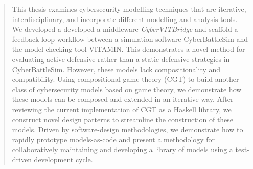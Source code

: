 \begin{abstract}

This thesis examines cybersecurity modelling techniques that are iterative, interdisciplinary, and incorporate different modelling and analysis tools. We developed a developed a middleware \textit{CyberVITBridge} and scaffold a feedback-loop workflow between a simulation software CyberBattleSim and the model-checking tool VITAMIN. This demonstrates a novel method for evaluating active defensive rather than a static defensive strategies in CyberBattleSim. However, these models lack compositionality and compatibility. Using compositional game theory (CGT) to build another class of cybersecurity models based on game theory, we demonstrate how these models can be composed and extended in an iterative way. After reviewing the current implementation of CGT as a Haskell library, we construct novel design patterns to streamline the construction of these models. Driven by software-design methodologies, we demonstrate how to rapidly prototype models-as-code and present a methodology for collaboratively maintaining and developing a library of models using a test-driven development cycle.  

\end{abstract}


